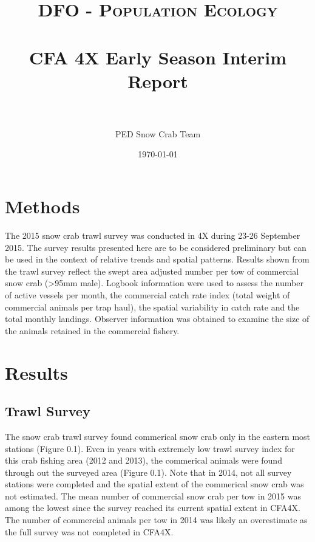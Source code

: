 \documentclass[paper=a4, fontsize=11pt]{article}
\title{
\normalfont \normalsize 
\textsc{DFO - Population Ecology} \\ [25pt] 
\horrule{0.5pt} \\[0.4cm] 
\huge CFA 4X Early Season Interim Report\\ 
\horrule{2pt} \\[0.5cm] 
}
\author{PED Snow Crab Team}
\date{\normalsize\today}
\numberwithin{equation}{section}
\numberwithin{figure}{section}
\numberwithin{table}{section}
\begin{document}
\maketitle 

\section{Methods}

The 2015 snow crab trawl survey was conducted in 4X during 23-26 September 2015. The survey results presented here are to be considered preliminary but can be used in the context of relative trends and spatial patterns. Results shown from the trawl survey reflect the swept area adjusted number per tow of commercial snow crab (\textgreater 95mm male). Logbook information were used to assess the number of active vessels per month, the commercial catch rate index (total weight of commercial animals per trap haul), the spatial variability in catch rate and the total monthly landings. Observer information was obtained to examine the size of the animals retained in the commercial fishery.


\section{Results}
\subsection{Trawl Survey}
The snow crab trawl survey found commerical snow crab only in the eastern most stations (Figure 0.1). Even in years with extremely low trawl survey index for this crab fishing area (2012 and 2013), the commerical animals were found through out the surveyed area (Figure 0.1).  Note that in 2014, not all survey stations were completed and the spatial extent of the commerical snow crab was not estimated. The mean number of commercial snow crab per tow in 2015 was among the lowest since the survey reached its current spatial extent in CFA4X. The number of commercial animals per tow in 2014 was likely an overestimate as the full survey was not completed in CFA4X. 
\end{document}
